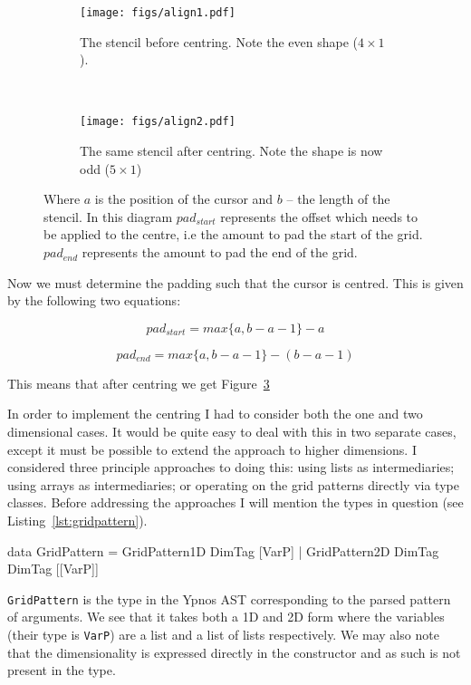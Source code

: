 \documentclass[
    12pt,
    a4paper,
    twoside,
    openright,
    ]{scrbook}
\begin{document}
\begin{figure}
  \centering
  \begin{subfigure}[t]{0.45\textwidth}
    \texttt{[image: figs/align1.pdf]}
    \caption{The stencil before centring. Note the even shape ($4\times1$).}
    \label{fig:cursor}
  \end{subfigure}
  ~
  \begin{subfigure}[t]{0.45\textwidth}
    \texttt{[image: figs/align2.pdf]}
    \caption{The same stencil after centring. Note the shape is now odd
      ($5\times1$)}
    \label{fig:centredcursor}
  \end{subfigure}
  \caption{Where $a$ is the position of the cursor and $b$ -- the length of the
    stencil.  In this diagram $pad_{start}$ represents the offset which needs to
    be applied to the centre, i.e the amount to pad the start of the
    grid. $pad_{end}$ represents the amount to pad the end of the grid. }
\end{figure}

Now we must determine the padding such that the cursor is centred. This is given
by the following two equations:

\[ pad_{start} = max \{a, b-a-1\} - a \]

\[ pad_{end} = max \{a, b-a-1\} - (b - a - 1) \]

This means that after centring we get Figure~\ref{fig:centredcursor}

In order to implement the centring I had to consider both the one and two
dimensional cases.  It would be quite easy to deal with this in two separate
cases, except it must be possible to extend the approach to higher dimensions. I
considered three principle approaches to doing this: using lists as
intermediaries; using arrays as intermediaries; or operating on the grid
patterns directly via type classes.  Before addressing the approaches I will
mention the types in question (see Listing~\ref{lst:gridpattern}).

\begin{hflisting}[label={lst:gridpattern}, caption=The data type which stores
  the grid patterns in Ypnos. Notice that the dimensionality is not exposed in
  the type but hidden.]
data GridPattern = GridPattern1D DimTag [VarP] |
                   GridPattern2D DimTag DimTag [[VarP]]
\end{hflisting}

\texttt{GridPattern} is the type in the Ypnos AST corresponding to the parsed
pattern of arguments. We see that it takes both a 1D and 2D form where the
variables (their type is \texttt{VarP}) are a list and a list of lists
respectively. We may also note that the dimensionality is expressed directly in
the constructor and as such is not present in the type.
\end{document}
